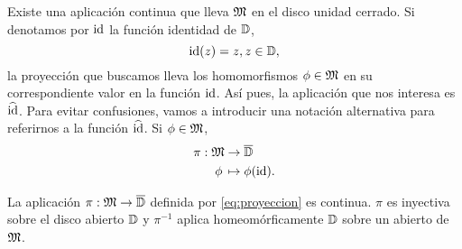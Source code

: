 Existe una aplicación continua que lleva $\mathfrak{M}$ en el disco unidad cerrado. Si denotamos por $\operatorname{id}$ la función identidad de $\mathbb{D}$,
\begin{equation*}
    \operatorname{id}(z) = z, z \in \mathbb{D},
\end{equation*}
la proyección que buscamos lleva los homomorfismos $\phi \in \mathfrak{M}$ en su correspondiente valor en la función $\operatorname{id}$. Así pues, la aplicación que nos interesa es $\widehat {\operatorname{id}}$. Para evitar confusiones, vamos a introducir una notación alternativa para referirnos a la función $\widehat {\operatorname{id}}$. Si $\phi \in \mathfrak{M}$,
\begin{equation}
    \label{eq:proyeccion}
    \begin{split}
        \pi: \mathfrak{M} & \to \overline{\mathbb{D}} \\
            \phi \, & \mapsto  \phi (\operatorname{id}).
    \end{split}
\end{equation}


\begin{theorem}
    La aplicación $\pi: \mathfrak{M} \to \overline{\mathbb{D}}$ definida por \eqref{eq:proyeccion} es continua. $\pi$ es inyectiva sobre el disco abierto $\mathbb{D}$ y $\pi^{-1}$ aplica homeomórficamente $\mathbb{D}$ sobre un abierto de $\mathfrak{M}$.
\end{theorem}


